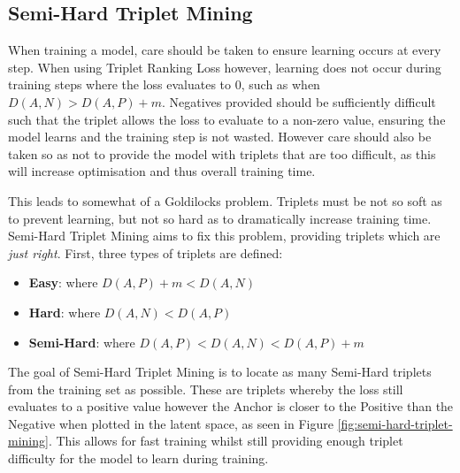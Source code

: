 \subsection{Semi-Hard Triplet Mining}\label{ch:ID,sec:SNNBackground,sub:SemiHardTripletMining}

When training a model, care should be taken to ensure learning occurs at every step. When using Triplet Ranking Loss however, learning does not occur during training steps where the loss evaluates to 0, such as when $D(A, N) > D(A, P) + m$. Negatives provided should be sufficiently difficult such that the triplet allows the loss to evaluate to a non-zero value, ensuring the model learns and the training step is not wasted. However care should also be taken so as not to provide the model with triplets that are too difficult, as this will increase optimisation and thus overall training time. 

This leads to somewhat of a Goldilocks problem. Triplets must be not so soft as to prevent learning, but not so hard as to dramatically increase training time. Semi-Hard Triplet Mining aims to fix this problem, providing triplets which are \textit{just right}. First, three types of triplets are defined:

\begin{itemize}
	\item \textbf{Easy}: where $D(A, P) + m < D(A, N)$
	\item \textbf{Hard}: where $D(A, N) < D(A, P)$
	\item \textbf{Semi-Hard}: where $D(A, P) < D(A, N) < D(A, P) + m$
\end{itemize}

The goal of Semi-Hard Triplet Mining is to locate as many Semi-Hard triplets from the training set as possible. These are triplets whereby the loss still evaluates to a positive value however the Anchor is closer to the Positive than the Negative when plotted in the latent space, as seen in Figure \ref{fig:semi-hard-triplet-mining}. This allows for fast training whilst still providing enough triplet difficulty for the model to learn during training. 

